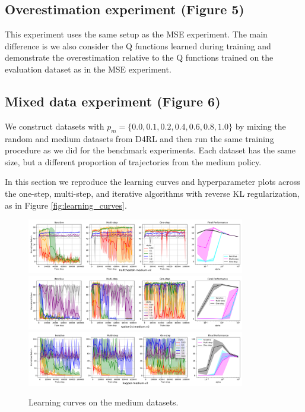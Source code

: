 \begin{subappendices}
\subsection{Overestimation experiment (Figure 5)}

This experiment uses the same setup as the MSE experiment. The main difference is we also consider the Q functions learned during training and demonstrate the overestimation relative to the Q functions trained on the evaluation dataset as in the MSE experiment.


\subsection{Mixed data experiment (Figure 6)}

We construct datasets with $ p_m = \{0.0, 0.1, 0.2, 0.4, 0.6, 0.8, 1.0\}$ by mixing the random and medium datasets from D4RL and then run the same training procedure as we did for the benchmark experiments. Each dataset has the same size, but a different proportion of trajectories from the medium policy.


\label{sec:app_extra_exp}

In this section we reproduce the learning curves and hyperparameter plots across the one-step, multi-step, and iterative algorithms with reverse KL regularization, as in Figure \ref{fig:learning_curves}.

\vspace{-0.2cm}
\begin{figure}[h]
    \centering
    \includegraphics[width=0.85\textwidth]{figures/offline-rl/learning curves/lc-halfcheetah-medium-v2.png}
    \includegraphics[width=0.85\textwidth]{figures/offline-rl/learning curves/lc-walker2d-medium-v2.png}
    \includegraphics[width=0.85\textwidth]{figures/offline-rl/learning curves/lc-hopper-medium-v2.png}
    \vspace{-0.2cm}
    \caption{Learning curves on the medium datasets.}
    \label{fig:app_lc_medium}
\end{figure}



\end{subappendices}

